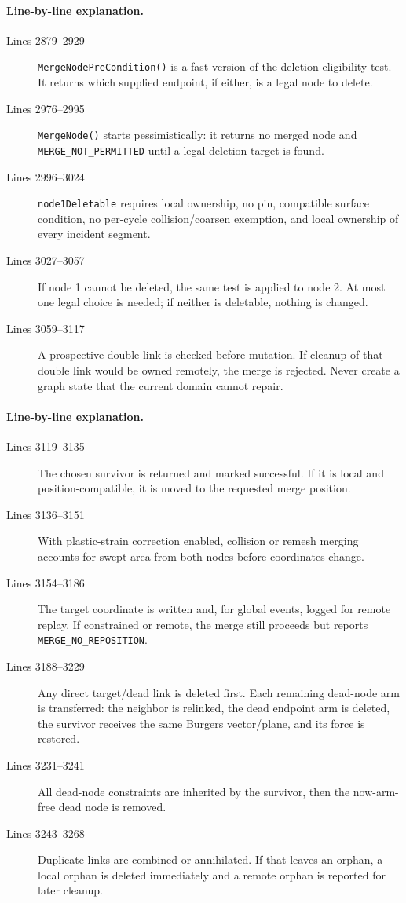 \documentclass[11pt]{article}
\newcommand{\code}[1]{\texorpdfstring{\nolinkurl{#1}}{#1}}
\begin{document}
\paragraph{Line-by-line explanation.}
\begin{description}
\item[Lines 2879--2929] \code{MergeNodePreCondition()} is a fast version of
the deletion eligibility test. It returns which supplied endpoint, if either,
is a legal node to delete.
\item[Lines 2976--2995] \code{MergeNode()} starts pessimistically: it returns
no merged node and \code{MERGE_NOT_PERMITTED} until a legal deletion target
is found.
\item[Lines 2996--3024] \code{node1Deletable} requires local ownership, no
pin, compatible surface condition, no per-cycle collision/coarsen exemption,
and local ownership of every incident segment.
\item[Lines 3027--3057] If node 1 cannot be deleted, the same test is applied
to node 2. At most one legal choice is needed; if neither is deletable,
nothing is changed.
\item[Lines 3059--3117] A prospective double link is checked before mutation.
If cleanup of that double link would be owned remotely, the merge is rejected.
Never create a graph state that the current domain cannot repair.
\end{description}



\paragraph{Line-by-line explanation.}
\begin{description}
\item[Lines 3119--3135] The chosen survivor is returned and marked
successful. If it is local and position-compatible, it is moved to the
requested merge position.
\item[Lines 3136--3151] With plastic-strain correction enabled, collision or
remesh merging accounts for swept area from both nodes before coordinates
change.
\item[Lines 3154--3186] The target coordinate is written and, for global
events, logged for remote replay. If constrained or remote, the merge still
proceeds but reports \code{MERGE_NO_REPOSITION}.
\item[Lines 3188--3229] Any direct target/dead link is deleted first. Each
remaining dead-node arm is transferred: the neighbor is relinked, the dead
endpoint arm is deleted, the survivor receives the same Burgers vector/plane,
and its force is restored.
\item[Lines 3231--3241] All dead-node constraints are inherited by the
survivor, then the now-arm-free dead node is removed.
\item[Lines 3243--3268] Duplicate links are combined or annihilated. If that
leaves an orphan, a local orphan is deleted immediately and a remote orphan
is reported for later cleanup.
\end{description}
\end{document}
